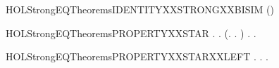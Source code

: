 \newcommand{\HOLStrongEQTheoremsEQUALXXIMPXXSTRONGXXEQUIV}{\UseVerbatim{HOLStrongEQTheoremsEQUALXXIMPXXSTRONGXXEQUIV}}
\begin{SaveVerbatim}{HOLStrongEQTheoremsIDENTITYXXSTRONGXXBISIM}
\HOLTokenTurnstile{}  (\HOLSymConst{=})
\end{SaveVerbatim}
\newcommand{\HOLStrongEQTheoremsIDENTITYXXSTRONGXXBISIM}{\UseVerbatim{HOLStrongEQTheoremsIDENTITYXXSTRONGXXBISIM}}
\begin{SaveVerbatim}{HOLStrongEQTheoremsPROPERTYXXSTAR}
\HOLTokenTurnstile{} \HOLSymConst{\HOLTokenForall{}} .
          \HOLSymConst{\HOLTokenEquiv{}}
       \HOLSymConst{\HOLTokenForall{}}.
           (\HOLSymConst{\HOLTokenForall{}}.  \HOLTokenTransBegin{}\HOLTokenTransEnd {} \HOLSymConst{\HOLTokenImp{}} \HOLSymConst{\HOLTokenExists{}}.  \HOLTokenTransBegin{}\HOLTokenTransEnd {} \HOLSymConst{\HOLTokenConj{}}   ) \HOLSymConst{\HOLTokenConj{}}
           \HOLSymConst{\HOLTokenForall{}}.  \HOLTokenTransBegin{}\HOLTokenTransEnd {} \HOLSymConst{\HOLTokenImp{}} \HOLSymConst{\HOLTokenExists{}}.  \HOLTokenTransBegin{}\HOLTokenTransEnd {} \HOLSymConst{\HOLTokenConj{}}   
\end{SaveVerbatim}
\newcommand{\HOLStrongEQTheoremsPROPERTYXXSTAR}{\UseVerbatim{HOLStrongEQTheoremsPROPERTYXXSTAR}}
\begin{SaveVerbatim}{HOLStrongEQTheoremsPROPERTYXXSTARXXLEFT}
\HOLTokenTurnstile{} \HOLSymConst{\HOLTokenForall{}} .
          \HOLSymConst{\HOLTokenImp{}}
       \HOLSymConst{\HOLTokenForall{}} .  \HOLTokenTransBegin{}\HOLTokenTransEnd {} \HOLSymConst{\HOLTokenImp{}} \HOLSymConst{\HOLTokenExists{}}.  \HOLTokenTransBegin{}\HOLTokenTransEnd {} \HOLSymConst{\HOLTokenConj{}}   
\end{SaveVerbatim}
